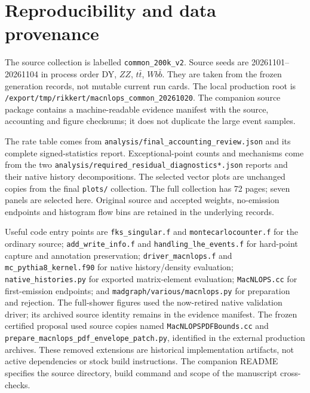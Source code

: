 \documentclass[11pt,a4paper]{article}
\newcommand{\code}[1]{\texttt{\small #1}}
\begin{document}
\section{Reproducibility and data provenance}
\label{app:repro}
The source collection is labelled \code{common\_200k\_v2}. Source seeds
are 20261101--20261104 in process order DY, $ZZ$, $t\bar t$, $Wb\bar b$.
They are taken from the frozen generation records, not mutable current
run cards. The local production root is
\code{/export/tmp/rikkert/macnlops\_common\_20261020}.
The companion source package contains a machine-readable evidence
manifest with the source, accounting and figure checksums; it does
not duplicate the large event samples.

The rate table comes from \code{analysis/final\_accounting\_review.json}
and its complete signed-statistics report. Exceptional-point counts
and mechanisms come from the two
\code{analysis/required\_residual\_diagnostics*.json} reports and their
native history decompositions. The selected vector plots are unchanged
copies from the final \code{plots/} collection. The full collection
has 72 pages; seven panels are selected here. Original source and
accepted weights, no-emission endpoints and histogram flow bins are
retained in the underlying records.

Useful code entry points are \code{fks\_singular.f} and
\code{montecarlocounter.f} for the ordinary source;
\code{add\_write\_info.f} and \code{handling\_lhe\_events.f} for hard-point
capture and annotation preservation;
\code{driver\_macnlops.f} and \code{mc\_pythia8\_kernel.f90} for native
history/density evaluation; \code{native\_histories.py} for exported
matrix-element evaluation; \code{MacNLOPS.cc} for first-emission endpoints; and
\code{madgraph/various/macnlops.py} for preparation and rejection.
The full-shower figures used the now-retired native validation driver;
its archived source identity remains in the evidence manifest.
The frozen certified proposal used source copies named
\code{MacNLOPSPDFBounds.cc} and
\code{prepare\_macnlops\_pdf\_envelope\_patch.py}, identified in the
external production archives. These removed extensions are historical
implementation artifacts, not active dependencies or stock build instructions.
The companion README specifies the source directory, build command
and scope of the manuscript cross-checks.

\begingroup
\small
\setlength{\bibsep}{4pt}


\endgroup
\end{document}
